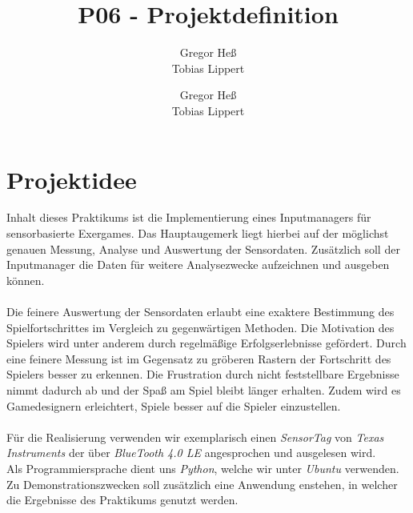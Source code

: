 \documentclass[12pt, accentcolor=tud1b, bigchapter, nochapterpage]{tudreport}
\title{\textbf{P06 - Projektdefinition}}
\subtitle{Gregor He\ss \\ Tobias Lippert}
\author{Gregor He\ss \\
		Tobias Lippert}
\begin{document}
\maketitle

\chapter*{Projektidee}
Inhalt dieses Praktikums ist die Implementierung eines Inputmanagers f\"ur sensorbasierte Exergames. Das Hauptaugemerk liegt hierbei auf der m\"oglichst genauen Messung, Analyse und Auswertung der Sensordaten. Zus\"atzlich soll der Inputmanager die Daten f\"ur weitere Analysezwecke aufzeichnen und ausgeben k\"onnen. \\ \\
Die feinere Auswertung der Sensordaten erlaubt eine exaktere Bestimmung des Spielfortschrittes im Vergleich zu gegenw\"artigen Methoden. Die Motivation des Spielers wird unter anderem durch regelm\"a\ss ige Erfolgserlebnisse gef\"ordert. Durch eine feinere Messung ist im Gegensatz zu gr\"oberen Rastern der Fortschritt des Spielers besser zu erkennen. Die Frustration durch nicht feststellbare Ergebnisse nimmt dadurch ab und der Spa\ss{} am Spiel bleibt l\"anger erhalten. Zudem wird es Gamedesignern erleichtert, Spiele besser auf die Spieler einzustellen.\\ \\
F\"ur die Realisierung verwenden wir exemplarisch einen \emph{SensorTag} von \textit{Texas Instruments} der \"uber \textit{BlueTooth 4.0 LE} angesprochen und ausgelesen wird. \\ Als Programmiersprache dient uns \textit{Python}, welche wir unter \textit{Ubuntu} verwenden. Zu Demonstrationszwecken soll zus\"atzlich eine Anwendung enstehen, in welcher die Ergebnisse des Praktikums genutzt werden. 
\end{document}
